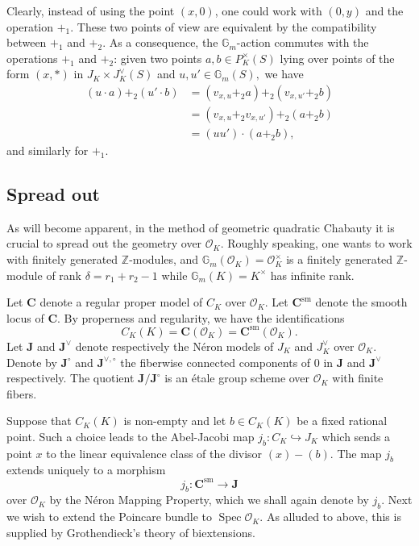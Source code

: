 \documentclass[11pt,oneside]{amsart}
\theoremstyle{plain}
\theoremstyle{definition}
\def\G{{\bf G}}
\DeclareMathOperator{\sm}{sm}
\DeclareMathOperator{\spec}{Spec} \DeclareMathOperator{\sgn}{sign}
\def\Z{\mathbb{Z}}
\def\J{\mathbf{J}}
\def\Jo{\mathbf{J}^{\vee,\circ}}
\def\G{\mathbb{G}}
\def\CC{\mathbf{C}}
\def\oh{\mathcal{O}}
\begin{document}
Clearly, instead of using the point $(x, 0)$, one could work with $(0, y)$ and the operation $+_1$. These two points of view are equivalent by the compatibility between $+_1$ and $+_2$. As a consequence, the $\G_m$-action commutes with the operations $+_1$ and $+_2$: given two points $a, b \in P_K^{\times}(S)$ lying over points of the form $(x, *)$ in $J_K\times J_K^{\vee}(S)$ %
and $u, u' \in \G_m(S),$ we have
\begin{align*}
(u \cdot a)+_2(u' \cdot b)& = (v_{x, u}+_2 a)+_2(v_{x, u'}+_2 b)\\
& =(v_{x, u}+_2v_{x, u'})+_2(a+_2b) \\
& =(uu') \cdot (a+_2b),
\end{align*}
and similarly for $+_1$.
  
 





\subsection{Spread out}\label{s:spread}

As will become apparent, in the method of geometric quadratic Chabauty it is crucial to spread out the geometry over $\oh_K$. Roughly speaking, one wants to work with finitely generated $\Z$-modules, and $\G_m(\oh_K)=\oh_K^\times$  is a finitely generated $\Z$-module of rank $\delta=r_1+r_2-1$ while $\G_m(K)=K^\times$ has infinite rank. 

Let $\CC$ denote a regular proper model of $C_K$ over $\oh_K$. Let $\CC^{\sm}$ denote the smooth locus of $\CC$. %
By properness and regularity, we have the identifications 
$$    C_K(K)=\CC(\oh_K)=\CC^{\sm}(\oh_K) .$$
Let $\J$ and $\J^{\vee}$ denote respectively the N\'eron models of $J_K$ and $J_K^{\vee}$ over $\oh_K$. Denote by $\J^{\circ}$ and $\Jo$ the fiberwise connected components of $0$ in $\J$ and $\J^{\vee}$ respectively. The quotient $\J/\J^{\circ}$ is an \'etale group scheme over $\oh_K$ with finite fibers. 

Suppose that $C_K(K)$ is non-empty and let $b\in C_K(K)$ be a fixed  rational point. Such a choice leads to the Abel-Jacobi map $j_b : C_K\hookrightarrow J_K$ which sends a point $x$ to the linear equivalence class of the divisor $(x)-(b)$.
The map $j_b$ extends uniquely to a morphism 
   $$ j_b: \CC^{\text{sm}}\rightarrow \J $$
over $\oh_K$ by the N\'eron Mapping Property, which we shall again denote by $j_b$. Next we wish to extend the Poincare bundle to $\spec \oh_K$. As alluded to above, this is supplied by Grothendieck's theory of biextensions. 
\end{document}
